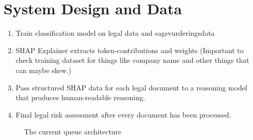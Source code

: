 \section{System Design and Data}

\begin{enumerate}
  \item Train classification model on legal data and sagsvurderingsdata
  \item SHAP Explainer extracts token-contributions and weights (Important to check training dataset for things like company name and other things that can maybe skew.)
  \item Pass structured SHAP data for each legal document to a reasoning model that produces human-readable reasoning.
  \item Final legal risk assessment after every document has been processed.
\end{enumerate}


\begin{figure}[H]
  \centering
  
  \caption{The current queue architecture}
  \label{fix:sv-post-redis}
\end{figure}
